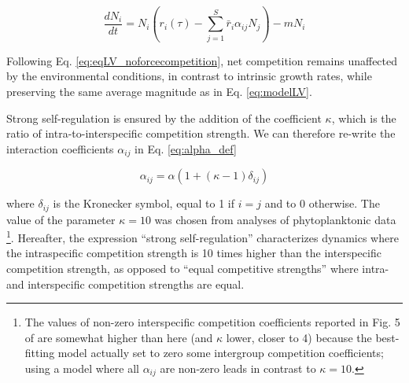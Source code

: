 \documentclass[a4paper,12pt]{article}
\begin{document}
\begin{equation}
\frac{dN_{i}}{dt}=N_{i}\left(r_{i}(\tau)-\sum_{j=1}^{S}\bar{r}_{i}\alpha_{ij}N_{j}\right)-mN_{i}\label{eq:eqLV_noforcecompetition}
\end{equation}

Following Eq. \ref{eq:eqLV_noforcecompetition}, net competition remains
unaffected by the environmental conditions, in contrast to intrinsic
growth rates, while preserving the same average magnitude as in Eq.
\ref{eq:modelLV}.

Strong self-regulation is ensured by the addition of the coefficient
$\kappa$, which is the ratio of intra-to-interspecific competition
strength. We can therefore re-write the interaction coefficients $\alpha_{ij}$
in Eq. \ref{eq:alpha_def}

\begin{equation}
\alpha_{ij}=\alpha\left(1+(\kappa-1)\delta_{ij}\right)\label{eq:alpha_def}
\end{equation}

where $\delta_{ij}$ is the Kronecker symbol, equal to 1 if $i=j$
and to 0 otherwise. The value of the parameter $\kappa=10$ was chosen
from analyses of phytoplanktonic data \citep{barraquand2018coastal}\footnote{The values of non-zero interspecific competition coefficients reported
in Fig. 5 of \citet{barraquand2018coastal} are somewhat higher than
here (and $\kappa$ lower, closer to 4) because the best-fitting model
actually set to zero some intergroup competition coefficients; using
a model where all $\alpha_{ij}$ are non-zero leads in contrast to
$\kappa=10$.}. Hereafter, the expression ``strong self-regulation'' characterizes
dynamics where the intraspecific competition strength is 10 times
higher than the interspecific competition strength, as opposed to
``equal competitive strengths'' where intra- and interspecific competition
strengths are equal. 
\end{document}
